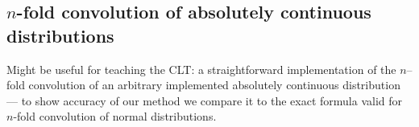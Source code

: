\documentclass[11pt]{article}
\begin{document}
\subsection{$n$-fold convolution of absolutely continuous distributions}\label{exe10}
\begin{small}
Might be useful for teaching the CLT: a straightforward implementation of the $n$--fold convolution of an
arbitrary implemented absolutely continuous distribution --- to show accuracy of our method we compare it to the
exact formula valid for $n$-fold convolution of normal distributions.
\end{small}
\end{document}
